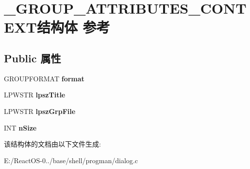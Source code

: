 \hypertarget{struct___g_r_o_u_p___a_t_t_r_i_b_u_t_e_s___c_o_n_t_e_x_t}{}\section{\+\_\+\+G\+R\+O\+U\+P\+\_\+\+A\+T\+T\+R\+I\+B\+U\+T\+E\+S\+\_\+\+C\+O\+N\+T\+E\+X\+T结构体 参考}
\label{struct___g_r_o_u_p___a_t_t_r_i_b_u_t_e_s___c_o_n_t_e_x_t}
\subsection*{Public 属性}
\begin{DoxyCompactItemize}
\item 
\mbox{\label{struct___g_r_o_u_p___a_t_t_r_i_b_u_t_e_s___c_o_n_t_e_x_t_ac9525636c163f653e8fa391137eac0fb}} 
G\+R\+O\+U\+P\+F\+O\+R\+M\+AT {\bfseries format}
\item 
\mbox{\label{struct___g_r_o_u_p___a_t_t_r_i_b_u_t_e_s___c_o_n_t_e_x_t_a2218266c3ea24ec958f3706bef788d78}} 
L\+P\+W\+S\+TR {\bfseries lpsz\+Title}
\item 
\mbox{\label{struct___g_r_o_u_p___a_t_t_r_i_b_u_t_e_s___c_o_n_t_e_x_t_ab91d18f61e0c43c7908251d82fb50a66}} 
L\+P\+W\+S\+TR {\bfseries lpsz\+Grp\+File}
\item 
\mbox{\label{struct___g_r_o_u_p___a_t_t_r_i_b_u_t_e_s___c_o_n_t_e_x_t_ac39716d94976ba67d9bec888909b67dc}} 
I\+NT {\bfseries n\+Size}
\end{DoxyCompactItemize}


该结构体的文档由以下文件生成\+:\begin{DoxyCompactItemize}
\item 
E\+:/\+React\+O\+S-\/0../base/shell/progman/dialog.\+c\end{DoxyCompactItemize}
